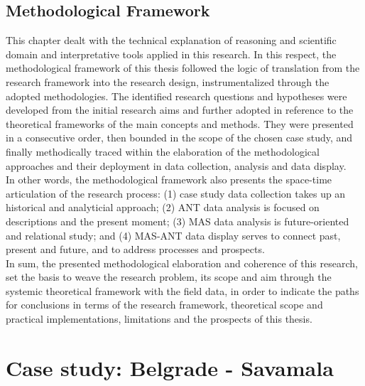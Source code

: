 \documentclass[11pt]{report}
\begin{document}
\section{Methodological Framework}

This chapter dealt with the technical explanation of reasoning and scientific domain and interpretative tools applied in this research.
In this respect, the methodological framework of this thesis followed the logic of translation from the research framework into the research design, instrumentalized through the adopted methodologies.
The identified research questions and hypotheses were developed from the initial research aims and further adopted in reference to the theoretical frameworks of the main concepts and methods. 
They were presented in a consecutive order, then bounded in the scope of the chosen case study, and finally methodically traced within the elaboration of the methodological approaches and their deployment in data collection, analysis and data display.
\\
In other words, the methodological framework also presents the space-time articulation of the research process:
(1) case study data collection takes up an historical and analyticial approach;
(2) ANT data analysis is focused on descriptions and the present moment;
(3) MAS data analysis is future-oriented and relational study;
and
(4) MAS-ANT data display serves to connect past, present and future, and to address processes and prospects.
\\
In sum, the presented methodological elaboration and coherence of this research, set the basis to weave the research problem, its scope and aim through the systemic theoretical framework with the field data, in order to indicate the paths for conclusions in terms of the research framework, theoretical scope and practical implementations, limitations and the prospects of this thesis.



\chapter{Case study: Belgrade - Savamala}
\end{document}
